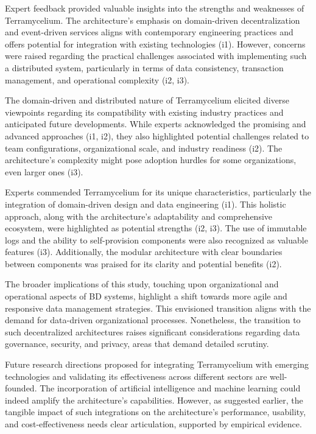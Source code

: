 \documentclass{ieeeaccess}
\begin{document}
Expert feedback provided valuable insights into the strengths and weaknesses of Terramycelium. The architecture's emphasis on domain-driven decentralization and event-driven services aligns with contemporary engineering practices and offers potential for integration with existing technologies (i1). However, concerns were raised regarding the practical challenges associated with implementing such a distributed system, particularly in terms of data consistency, transaction management, and operational complexity (i2, i3).

The domain-driven and distributed nature of Terramycelium elicited diverse viewpoints regarding its compatibility with existing industry practices and anticipated future developments. While experts acknowledged the promising and advanced approaches (i1, i2), they also highlighted potential challenges related to team configurations, organizational scale, and industry readiness (i2). The architecture's complexity might pose adoption hurdles for some organizations, even larger ones (i3).

Experts commended Terramycelium for its unique characteristics, particularly the integration of domain-driven design and data engineering (i1). This holistic approach, along with the architecture's adaptability and comprehensive ecosystem, were highlighted as potential strengths (i2, i3). The use of immutable logs and the ability to self-provision components were also recognized as valuable features (i3). Additionally, the modular architecture with clear boundaries between components was praised for its clarity and potential benefits (i2).

The broader implications of this study, touching upon organizational and operational aspects of BD systems, highlight a shift towards more agile and responsive data management strategies. This envisioned transition aligns with the demand for data-driven organizational processes. Nonetheless, the transition to such decentralized architectures raises significant considerations regarding data governance, security, and privacy, areas that demand detailed scrutiny.

Future research directions proposed for integrating Terramycelium with emerging technologies and validating its effectiveness across different sectors are well-founded. The incorporation of artificial intelligence and machine learning could indeed amplify the architecture's capabilities. However, as suggested earlier, the tangible impact of such integrations on the architecture's performance, usability, and cost-effectiveness needs clear articulation, supported by empirical evidence.
\end{document}
